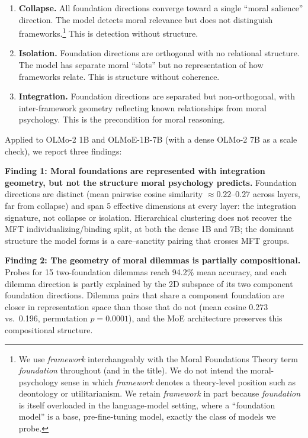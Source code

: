 \begin{enumerate}
\def\labelenumi{\arabic{enumi}.}
\item
  \textbf{Collapse.} All foundation directions converge toward a single
  ``moral salience'' direction. The model detects moral relevance
  but does not distinguish frameworks.\footnote{We use \emph{framework}
    interchangeably with the Moral Foundations Theory term \emph{foundation}
    throughout (and in the title). We do not intend the moral-psychology
    sense in which \emph{framework} denotes a theory-level position such as
    deontology or utilitarianism. We retain \emph{framework} in part because
    \emph{foundation} is itself overloaded in the language-model setting,
    where a ``foundation model'' is a base, pre-fine-tuning model,
    exactly the class of models we probe.} This is detection without
  structure.
\item
  \textbf{Isolation.} Foundation directions are orthogonal with no
  relational structure. The model has separate moral ``slots'' but
  no representation of how frameworks relate. This is structure
  without coherence.
\item
  \textbf{Integration.} Foundation directions are separated but
  non-orthogonal, with inter-framework geometry reflecting known
  relationships from moral psychology. This is the precondition
  for moral reasoning.
\end{enumerate}

Applied to OLMo-2 1B and OLMoE-1B-7B (with a dense OLMo-2 7B as a
scale check), we report three findings:

\textbf{Finding 1: Moral foundations are represented with integration
geometry, but not the structure moral psychology predicts.}
Foundation directions are distinct (mean pairwise cosine similarity
\(\approx 0.22\)--\(0.27\) across layers, far from collapse) and span 5
effective dimensions at every layer: the integration signature, not
collapse or isolation. Hierarchical clustering does not recover the
MFT individualizing/binding split, at both the dense 1B and 7B; the dominant
structure the model forms is a care--sanctity pairing that crosses
MFT groups.

\textbf{Finding 2: The geometry of moral dilemmas is partially
compositional.} Probes for 15 two-foundation dilemmas reach 94.2\%
mean accuracy, and each dilemma direction is partly explained by the
2D subspace of its two component foundation directions. Dilemma pairs
that share a component foundation are closer in representation space
than those that do not (mean cosine 0.273 vs.~0.196, permutation
\(p = 0.0001\)), and the MoE architecture preserves this compositional
structure.

